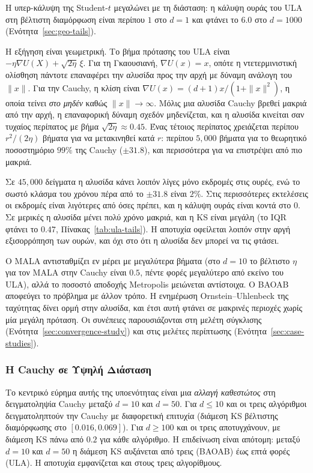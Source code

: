 Η υπερ-κάλυψη της Student-$t$ μεγαλώνει με τη διάσταση: η κάλυψη ουράς του ULA στη
βέλτιστη διαμόρφωση είναι περίπου $1$ στο $d=1$ και φτάνει το $6.0$ στο $d=1000$
(Ενότητα~\ref{sec:geo-tails}).

Η εξήγηση είναι γεωμετρική. Το βήμα πρότασης του ULA είναι
$-\eta \nabla U(X) + \sqrt{2\eta}\,\xi$. Για τη Γκαουσιανή, $\nabla U(x) = x$,
οπότε η ντετερμινιστική ολίσθηση πάντοτε επαναφέρει την αλυσίδα προς την αρχή
με δύναμη ανάλογη του $\|x\|$. Για την Cauchy, η κλίση είναι
$\nabla U(x) = (d+1) x / (1+\|x\|^2)$, η οποία τείνει \emph{στο μηδέν} καθώς
$\|x\|\to\infty$. Μόλις μια αλυσίδα Cauchy βρεθεί μακριά από την αρχή, η
επαναφορική δύναμη σχεδόν μηδενίζεται, και η αλυσίδα κινείται σαν τυχαίος περίπατος
με βήμα $\sqrt{2\eta} \approx 0.45$. Ένας τέτοιος περίπατος χρειάζεται περίπου
$r^2/(2\eta)$ βήματα για να μετακινηθεί κατά $r$: περίπου $5{,}000$ βήματα για το
θεωρητικό ποσοστημόριο $99\%$ της Cauchy ($\pm 31.8$), και περισσότερα για να
επιστρέψει από πιο μακριά.

Σε $45{,}000$ δείγματα η αλυσίδα κάνει λοιπόν λίγες μόνο εκδρομές στις ουρές, ενώ το
σωστό κλάσμα του χρόνου πέρα από το $\pm 31.8$ είναι $2\%$. Στις περισσότερες
εκτελέσεις οι εκδρομές είναι λιγότερες από όσες πρέπει, και η κάλυψη ουράς είναι κοντά
στο $0$. Σε μερικές η αλυσίδα μένει πολύ χρόνο μακριά, και η KS είναι μεγάλη (το IQR
φτάνει το $0.47$, Πίνακας~\ref{tab:ula-tails}). Η αποτυχία οφείλεται λοιπόν στην αργή
εξισορρόπηση των ουρών, και όχι στο ότι η αλυσίδα δεν μπορεί να τις φτάσει.

Ο MALA αντισταθμίζει εν μέρει με μεγαλύτερα βήματα (στο $d=10$ το
βέλτιστο $\eta$ για τον MALA στην Cauchy είναι $0.5$, πέντε φορές μεγαλύτερο από
εκείνο του ULA), αλλά το ποσοστό αποδοχής Metropolis μειώνεται αντίστοιχα. Ο BAOAB
αποφεύγει το πρόβλημα με άλλον τρόπο. Η ενημέρωση Ornstein--Uhlenbeck της ταχύτητας
δίνει ορμή στην αλυσίδα, και έτσι αυτή φτάνει σε μακρινές περιοχές
χωρίς μία μεγάλη πρόταση.
Οι συνέπειες παρουσιάζονται στη μελέτη σύγκλισης
(Ενότητα~\ref{sec:convergence-study}) και στις μελέτες περίπτωσης
(Ενότητα~\ref{sec:case-studies}).


\subsubsection{Η Cauchy σε Υψηλή Διάσταση}
\label{sec:dim-dependence-tails}

Το κεντρικό εύρημα αυτής της υποενότητας είναι μια \emph{αλλαγή καθεστώτος}
στη δειγματοληψία Cauchy μεταξύ $d=10$ και $d=50$. Για $d \le 10$ και οι τρεις
αλγόριθμοι δειγματοληπτούν την Cauchy με διαφορετική επιτυχία (διάμεση KS
βέλτιστης διαμόρφωσης στο $[0.016, 0.069]$). Για $d \ge 100$ και οι τρεις
αποτυγχάνουν, με διάμεση KS πάνω από $0.2$ για κάθε αλγόριθμο.
Η επιδείνωση είναι απότομη: μεταξύ $d=10$ και $d=50$ η διάμεση
KS αυξάνεται από τρεις (BAOAB) έως επτά φορές (ULA). Η αποτυχία εμφανίζεται και στους τρεις
αλγορίθμους.

